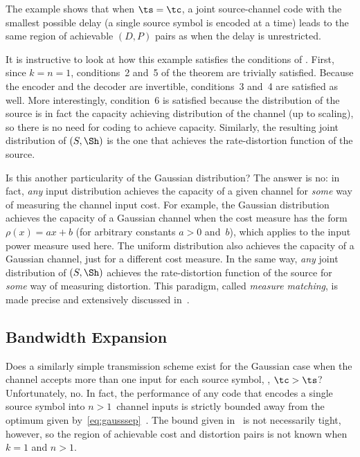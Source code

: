 The example shows that when $\ts = \tc$, a joint source-channel code with the
smallest possible delay (a single source symbol is encoded at a time) leads to
the same region of achievable $(D,P)$ pairs as when the delay is unrestricted.

It is instructive to look at how this example satisfies the conditions of
. First, since $k = n = 1$, conditions~2 and~5 of
the theorem are trivially satisfied. Because the encoder and the decoder are
invertible, conditions~3 and~4 are satisfied as well. More interestingly,
condition~6 is satisfied because the distribution of the source is in fact the
capacity achieving distribution of the channel (up to scaling), so there is no
need for coding to achieve capacity. Similarly, the resulting joint distribution
of $(S, \Sh)$ is the one that achieves the rate-distortion function of the
source.

Is this another particularity of the Gaussian distribution? The answer is no: in
fact, \emph{any} input distribution achieves the capacity of a given channel for
\emph{some} way of measuring the channel input cost. For example, the Gaussian
distribution achieves the capacity of a Gaussian channel when the cost
measure has the form $\rho(x) = ax + b$ (for arbitrary constants $a > 0$
and~$b$), which applies to the input power measure used here. The uniform
distribution also achieves the capacity of a Gaussian channel, just for a
different cost measure. In the same way, \emph{any} joint distribution of $(S,
\Sh)$ achieves the rate-distortion function of the source for \emph{some} way of
measuring distortion. This paradigm, called \emph{measure matching}, is made
precise and extensively discussed in~\cite{GastparRV2003}.


\subsection{Bandwidth Expansion}

Does a similarly simple transmission scheme exist for the Gaussian case when the
channel accepts more than one input for each source symbol, \ie, $\tc > \ts$?
Unfortunately, no. In fact, the performance of any code that encodes a single
source symbol into $n>1$~channel inputs is strictly bounded away from the
optimum given by~\eqref{eq:gausssep}~\cite{IngberLZF2008}.  The bound given
in~\cite{IngberLZF2008} is not necessarily tight, however, so the region of
achievable cost and distortion pairs is not known when $k = 1$ and $n > 1$. 

